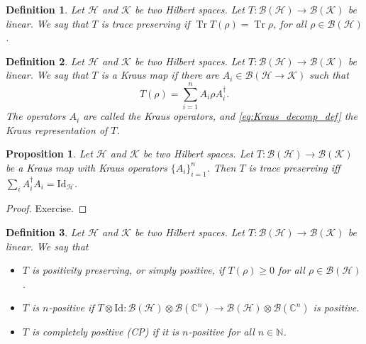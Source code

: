 \documentclass{article}
\newtheorem{proposition}{Proposition}
\newtheorem{definition}{Definition}
\theoremstyle{definition}
\newcommand{\tr}{\operatorname{Tr}}
\newcommand{\id}{\mathrm{Id}}
\newcommand{\bounded}[1]{\mathcal{B}(#1)}
\begin{document}
\begin{definition}
    Let $\mathcal{H}$ and $\mathcal{K}$ be two Hilbert spaces. Let $T:\bounded{\mathcal{H}}\to\bounded{\mathcal{K}}$ be linear. We say that $T$ is \emph{trace preserving} if $\tr T(\rho) = \tr \rho$, for all $\rho\in\bounded{\mathcal{H}}$.
\end{definition}

\begin{definition}
  Let $\mathcal{H}$ and $\mathcal{K}$ be two Hilbert spaces. Let $T:\bounded{\mathcal{H}}\to\bounded{\mathcal{K}}$ be linear. We say that $T$ is a Kraus map if there are $A_i\in \mathcal{B}(\mathcal{H}\rightarrow \mathcal{K})$ such that 
  \begin{equation}\label{eq:Kraus_decomp_def}
    T(\rho) = \sum_{i=1}^n A_i \rho A_i^\dagger.
  \end{equation}
  The operators $A_i$ are called the Kraus operators, and \cref{eq:Kraus_decomp_def} the Kraus representation of $T$.
\end{definition}

\begin{proposition}
    Let $\mathcal{H}$ and $\mathcal{K}$ be two Hilbert spaces. Let $T:\bounded{\mathcal{H}}\to\bounded{\mathcal{K}}$ be a Kraus map with Kraus operators $\{A_i\}_{i=1}^n$. Then $T$ is trace preserving iff $\sum_i A_i^\dagger A_i = \id_{\mathcal{H}}$.
\end{proposition}
\begin{proof}
  Exercise.
\end{proof}

\begin{definition}
  Let $\mathcal{H}$ and $\mathcal{K}$ be two Hilbert spaces. Let $T:\bounded{\mathcal{H}}\to\bounded{\mathcal{K}}$ be linear. We say that 
  \begin{itemize}
    \item $T$ is \emph{positivity preserving}, or simply \emph{positive}, if $T(\rho)\geq 0$ for all $\rho\in\bounded{\mathcal{H}}$. 
    \item $T$ is $n$-positive if $T\otimes\id: \bounded{\mathcal{H}}\otimes\bounded{\mathbb{C}^n} \to \bounded{\mathcal{H}} \otimes \bounded{\mathbb{C}^n}$ is positive.
    \item $T$ is \emph{completely positive (CP)} if it is $n$-positive for all $n\in\mathbb{N}$.
  \end{itemize}
\end{definition}
\end{document}
